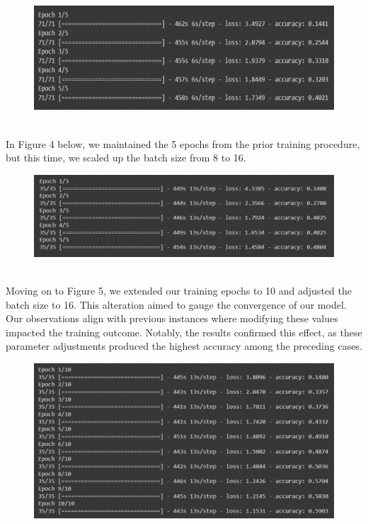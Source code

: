 \documentclass[12pt,a4paper]{article}
\begin{document}
\begin{figure}[h]
    \centering
    \includegraphics[width=\linewidth]{images/3.3.1.jpeg}
     
     
     \caption{}     \label{fig:my_label} 
    \end{figure}\\

In Figure 4 below, we maintained the 5 epochs from the prior training procedure, but this time, we scaled up the batch size from 8 to 16.
    
\begin{figure}[h]
    \centering
    \includegraphics[width=\linewidth]{images/3.3.2.jpeg}
     
     
     \caption{}     \label{fig:my_label} 
    \end{figure}\\

Moving on to Figure 5, we extended our training epochs to 10 and adjusted the batch size to 16. This alteration aimed to gauge the convergence of our model. Our observations align with previous instances where modifying these values impacted the training outcome. Notably, the results confirmed this effect, as these parameter adjustments produced the highest accuracy among the preceding cases.

\begin{figure}[h]
    \centering
    \includegraphics[width=\linewidth]{images/3.3.3.jpeg}
     
     
     \caption{}     \label{fig:my_label} 
    \end{figure}\\
\pagebreak
\end{document}

